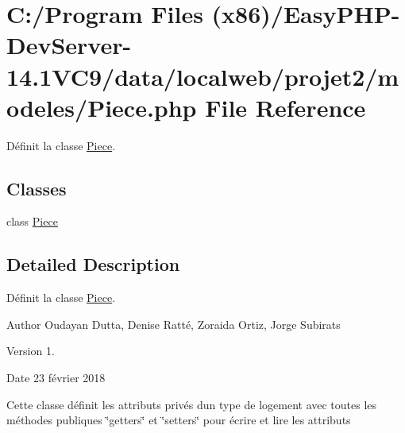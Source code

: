 \hypertarget{_piece_8php}{}\section{C\+:/\+Program Files (x86)/\+Easy\+P\+H\+P-\/\+Dev\+Server-\/14.1\+V\+C9/data/localweb/projet2/modeles/\+Piece.php File Reference}
\label{_piece_8php}


Définit la classe \hyperlink{class_piece}{Piece}.  


\subsection*{Classes}
\begin{DoxyCompactItemize}
\item 
class \hyperlink{class_piece}{Piece}
\end{DoxyCompactItemize}


\subsection{Detailed Description}
Définit la classe \hyperlink{class_piece}{Piece}. 

\begin{DoxyAuthor}{Author}
Oudayan Dutta, Denise Ratté, Zoraida Ortiz, Jorge Subirats 
\end{DoxyAuthor}
\begin{DoxyVersion}{Version}
1. 
\end{DoxyVersion}
\begin{DoxyDate}{Date}
23 février 2018
\end{DoxyDate}
Cette classe définit les attributs privés d\textquotesingle{}un type de logement avec toutes les méthodes publiques \char`\"{}getters\char`\"{} et \char`\"{}setters\char`\"{} pour écrire et lire les attributs 
